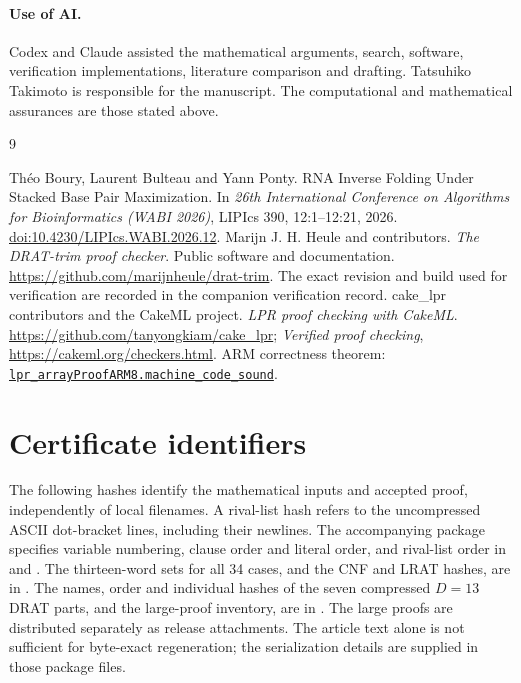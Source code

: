 \documentclass[11pt,a4paper]{article}
\theoremstyle{definition}
\begin{document}
\paragraph{Use of AI.}
Codex and Claude assisted the mathematical arguments, search, software,
verification implementations, literature comparison and drafting.
Tatsuhiko Takimoto is responsible for the manuscript. The computational
and mathematical assurances are those stated above.

\begin{thebibliography}{9}
\raggedright
{}
Th\'eo Boury, Laurent Bulteau and Yann Ponty.
RNA Inverse Folding Under Stacked Base Pair Maximization.
In \emph{26th International Conference on Algorithms for Bioinformatics
(WABI 2026)}, LIPIcs 390, 12:1--12:21, 2026.
\href{https://doi.org/10.4230/LIPIcs.WABI.2026.12}{doi:10.4230/LIPIcs.WABI.2026.12}.
Marijn J. H. Heule and contributors.
\emph{The DRAT-trim proof checker}. Public software and documentation.
\url{https://github.com/marijnheule/drat-trim}.
The exact revision and build used for verification are recorded in the
companion verification record.
cake\_lpr contributors and the CakeML project.
\emph{LPR proof checking with CakeML}.
\url{https://github.com/tanyongkiam/cake_lpr};
\emph{Verified proof checking}, \url{https://cakeml.org/checkers.html}.
ARM correctness theorem:
\href{https://github.com/CakeML/cakeml/blob/fb377b4bb704497c921cde68ccc8da3b4f0e9132/examples/lpr_checker/array/compilation/proofsARM8/lpr_arrayProofARM8Script.sml}{\texttt{lpr\_arrayProofARM8.machine\_code\_sound}}.
\end{thebibliography}

\appendix
\section{Certificate identifiers}\label{app:cert}
The following hashes identify the mathematical inputs and accepted
proof, independently of local filenames. A rival-list hash refers to
the uncompressed ASCII dot-bracket lines, including their newlines.
The accompanying package specifies variable numbering, clause order and
literal order, and rival-list order in  and
. The thirteen-word sets for all 34 cases,
and the CNF and LRAT hashes, are in .
The names, order and individual hashes of the seven compressed $D=13$
DRAT parts, and the large-proof inventory, are in
. The large proofs are distributed separately
as release attachments. The article text alone is not sufficient for
byte-exact regeneration; the serialization details are supplied in those
package files.
\end{document}
